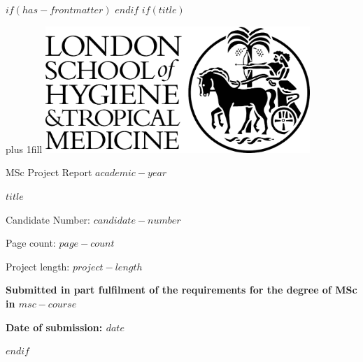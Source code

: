 $if(has-frontmatter)$
\frontmatter
$endif$
$if(title)$
\cleardoublepage
\thispagestyle{empty}
{\centering
\hbox{}\vskip 0cm plus 1fill
\includegraphics[width=10cm]{img/lshtm_logo_small.jpg}
\par
\vspace{6ex}
{\Large MSc Project Report $academic-year$ \par}
\vspace{6ex}
{\Huge\bfseries $title$ \par}
\vspace{6ex}
{\Large Candidate Number: $candidate-number$ \par}
\vspace{12ex}
{\small Page count:  $page-count$ \par}
\vspace{3ex}
{\small Project length: $project-length$ \par}
\vspace{6ex}
{\bfseries\large Submitted in part fulfilment of the requirements for the degree of MSc in $msc-course$ \par}
\vspace{3ex}
{\bfseries\large Date of submission:  $date$ \par}
\vspace{12ex}
}
$endif$
